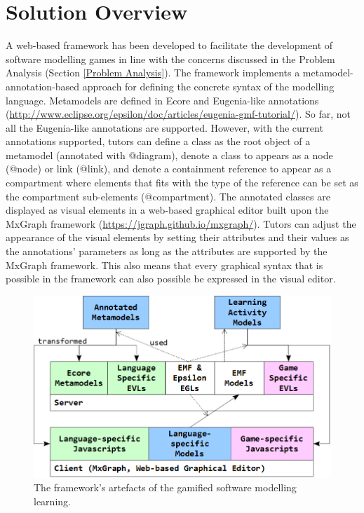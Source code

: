 \documentclass[conference]{IEEEtran}
\begin{document}
\section{Solution Overview}
\label{Solution Overview}
A web-based framework has been developed to facilitate the development of software modelling games in line with the concerns discussed in the Problem Analysis (Section \ref{Problem Analysis}). The framework implements a metamodel-annotation-based approach for defining the concrete syntax of the modelling language. Metamodels are defined in Ecore \cite{steinberg2008emf} and Eugenia-like annotations \cite{kolovos2015eugenia} (\url{http://www.eclipse.org/epsilon/doc/articles/eugenia-gmf-tutorial/}). So far, not all the Eugenia-like annotations are supported. However, with the current annotations supported, tutors can define a class as the root object of a metamodel (annotated with {\selectfont @diagram}), denote a class to appears as a node ({\selectfont @node}) or link ({\selectfont @link}), and denote a containment reference to appear as a compartment where elements that fits with the type of the reference can be set as the compartment sub-elements ({\selectfont @compartment}). The annotated classes are displayed as visual elements in a web-based graphical editor built upon the MxGraph framework (\url{https://jgraph.github.io/mxgraph/}). Tutors can adjust the appearance of the visual elements by setting their attributes and their values as the annotations' parameters as long as the attributes are supported by the MxGraph framework. This also means that every graphical syntax that is possible in the framework can also possible be expressed in the visual editor.   

\begin{figure}[!t]
\centering
\includegraphics[width=\linewidth]{artefacts}
\caption{The framework's artefacts of the gamified software modelling learning.}
\label{artefacts}
\end{figure}
\end{document}
